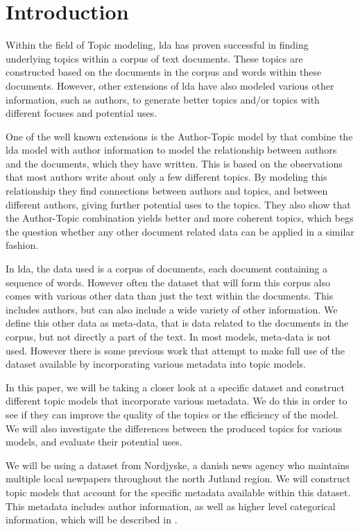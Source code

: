 \section{Introduction}\label{sec:introduction}
Within the field of Topic modeling, \gls{lda} has proven successful in finding underlying topics within a corpus of text documents.
These topics are constructed based on the documents in the corpus and words within these documents. 
However, other extensions of \gls{lda} have also modeled various other information, such as authors, to generate better topics and/or topics with different focuses and potential uses.

One of the well known extensions is the Author-Topic model by \citet{author_topic} that combine the \gls{lda} model with author information to model the relationship between authors and the documents, which they have written.
This is based on the observations that most authors write about only a few different topics.
By modeling this relationship they find connections between authors and topics, and between different authors, giving further potential uses to the topics.
They also show that the Author-Topic combination yields better and more coherent topics, which begs the question whether any other document related data can be applied in a similar fashion.

In \gls{lda}, the data used is a corpus of documents, each document containing a sequence of words. However often the dataset that will form this corpus also comes with various other data than just the text within the documents.
This includes authors, but can also include a wide variety of other information.
We define this other data as meta-data, that is data related to the documents in the corpus, but not directly a part of the text.
In most models, meta-data is not used.
However there is some previous work that attempt to make full use of the dataset available by incorporating various metadata into topic models.

In this paper, we will be taking a closer look at a specific dataset and construct different topic models that incorporate various metadata.
We do this in order to see if they can improve the quality of the topics or the efficiency of the model.
We will also investigate the differences between the produced topics for various models, and evaluate their potential uses.

We will be using a dataset from Nordjyske, a danish news agency who maintains multiple local newpapers throughout the north Jutland region.
We will construct topic models that account for the specific metadata available within this dataset.
This metadata includes author information, as well as higher level categorical information, which will be described in .

